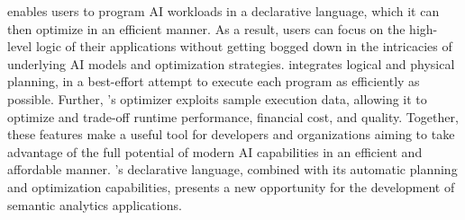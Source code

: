 \system{} enables users to program AI workloads in a declarative language, which it can then optimize in an efficient manner. As a result, users can focus on the high-level logic of their applications without getting bogged down in the intricacies of underlying AI models and optimization strategies. \system{} integrates logical and physical planning, in a best-effort attempt to execute each program as efficiently as possible. Further, \system's optimizer exploits sample execution data, allowing it to optimize and trade-off runtime performance, financial cost, and quality. Together, these features make \system{} a useful tool for developers and organizations aiming to take advantage of the full potential of modern AI capabilities in an efficient and affordable manner. \system's declarative language, combined with its automatic planning and optimization capabilities, presents a new opportunity for the development of semantic analytics applications.
